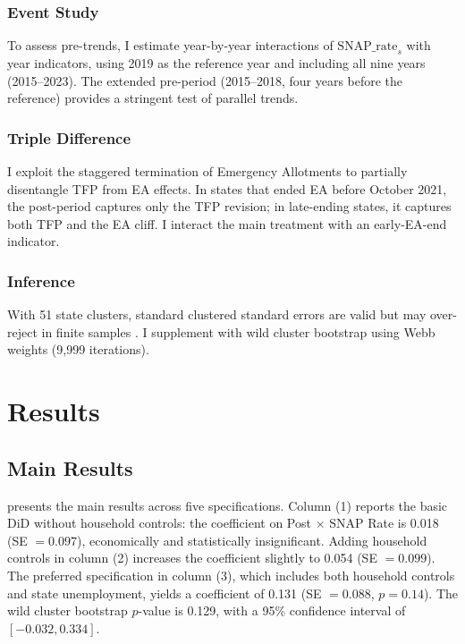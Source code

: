 \documentclass[12pt]{article}
\begin{document}
\subsubsection*{Event Study} To assess pre-trends, I estimate year-by-year interactions of $\text{SNAP\_rate}_s$ with year indicators, using 2019 as the reference year and including all nine years (2015--2023). The extended pre-period (2015--2018, four years before the reference) provides a stringent test of parallel trends.

\subsubsection*{Triple Difference} I exploit the staggered termination of Emergency Allotments to partially disentangle TFP from EA effects. In states that ended EA before October 2021, the post-period captures only the TFP revision; in late-ending states, it captures both TFP and the EA cliff. I interact the main treatment with an early-EA-end indicator.

\subsubsection*{Inference} With 51 state clusters, standard clustered standard errors are valid but may over-reject in finite samples \citep{cameron2008}. I supplement with wild cluster bootstrap using Webb weights (9,999 iterations).


\section{Results}

\subsection{Main Results}



 presents the main results across five specifications. Column (1) reports the basic DiD without household controls: the coefficient on Post $\times$ SNAP Rate is 0.018 (SE $= 0.097$), economically and statistically insignificant. Adding household controls in column (2) increases the coefficient slightly to 0.054 (SE $= 0.099$). The preferred specification in column (3), which includes both household controls and state unemployment, yields a coefficient of 0.131 (SE $= 0.088$, $p = 0.14$). The wild cluster bootstrap $p$-value is 0.129, with a 95\% confidence interval of $[-0.032, 0.334]$.
\end{document}
